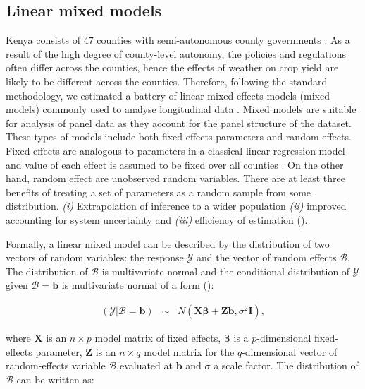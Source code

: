 \documentclass[a4paper,12pt]{article}
\begin{document}
\subsection{Linear mixed models}
\sloppy
Kenya consists of $47$ counties with semi-autonomous county governments  \citep{Barasa2017}. As a result of the high degree of county-level autonomy, the policies and regulations often differ across the counties, hence the effects of weather on crop yield are likely to be different across the counties. Therefore, following the standard methodology, we estimated a battery of linear mixed effects models (mixed models) commonly used to analyse longitudinal data \citep{bates2000mixed}. Mixed models are suitable for analysis of panel data as they account for the panel structure of the dataset. These types of models include both fixed effects parameters and random effects. Fixed effects are analogous to parameters in a classical linear regression model and value of each effect is assumed to be fixed over all counties \citep{bates2010lme4}. On the other hand, random effect are unobserved random variables. There are at least three benefits of treating a set of parameters as a random sample from some distribution. \textit{(i)} Extrapolation of inference to a wider population \textit{(ii)} improved accounting for system uncertainty and \textit{(iii)} efficiency of estimation (\citealp{KERYch9, KERYch12}).

Formally, a linear mixed model can be described by the distribution of two vectors of random variables: the response $\mathscr{Y}$ and the vector of random effects $\mathscr{B}$. The distribution of $\mathscr{B}$ is multivariate normal and the conditional distribution of $\mathscr{Y}$ given $\mathscr{B}=\mathbf{b}$ is multivariate normal of a form (\citealp{bates2010lme4, KERYch9}):




\begin{equation}\label{MixedGeneral}
\begin{array}{lcl}

(\mathscr{Y}|\mathscr{B}=\mathbf{b})& \sim & \mathit{N}(\mathbf{X}\mathbf{\beta}+\mathbf{Z}\mathbf{b},\sigma^2\mathbf{I}),

\end{array}
\end{equation}

where $\mathbf{X}$ is an $n \times p$ model matrix of fixed effects, $\mathbf{\beta}$ is a $p$-dimensional fixed-effects parameter, $\mathbf{Z}$ is an $n \times q$ model matrix for the $q$-dimensional vector of random-effects variable $\mathscr{B}$ evaluated at $\mathbf{b}$ and $\sigma$ a scale factor. The distribution of $\mathscr{B}$ can be written as: 
\end{document}
